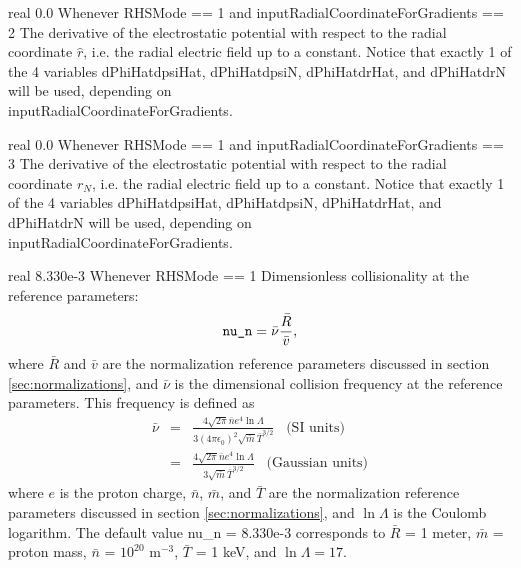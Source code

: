 {real}
{0.0}
{Whenever {\ttfamily RHSMode} == 1 and {\ttfamily inputRadialCoordinateForGradients} == 2}
{The derivative of the electrostatic potential with respect to the radial coordinate $\hat{r}$,
i.e. the radial electric field up to a constant.
Notice that exactly 1 of the 4 variables {\ttfamily dPhiHatdpsiHat}, {\ttfamily dPhiHatdpsiN}, {\ttfamily dPhiHatdrHat}, and {\ttfamily dPhiHatdrN}
will be used, depending on\\
{\ttfamily inputRadialCoordinateForGradients}.
}

\myhrule

{real}
{0.0}
{Whenever {\ttfamily RHSMode} == 1 and {\ttfamily inputRadialCoordinateForGradients} == 3}
{The derivative of the electrostatic potential with respect to the radial coordinate $r_N$,
i.e. the radial electric field up to a constant.
Notice that exactly 1 of the 4 variables {\ttfamily dPhiHatdpsiHat}, {\ttfamily dPhiHatdpsiN}, {\ttfamily dPhiHatdrHat}, and {\ttfamily dPhiHatdrN}
will be used, depending on\\
{\ttfamily inputRadialCoordinateForGradients}.
}

\myhrule

{real}
{8.330e-3}
{Whenever {\ttfamily RHSMode} == 1}
{Dimensionless collisionality at the reference parameters:
\begin{equation}
\mbox{\ttfamily nu\_n} = \bar{\nu} \frac{\bar{R}}{\bar{v}},
\end{equation}
where $\bar{R}$ and $\bar{v}$ are the normalization reference parameters discussed in section \ref{sec:normalizations},
and $\bar{\nu}$ is the dimensional collision frequency at the reference parameters. This frequency is defined as
\begin{eqnarray}
\bar{\nu}
&=& \frac{4\sqrt{2\pi} \bar{n} e^4 \ln\Lambda}{3 (4\pi\epsilon_0)^2 \sqrt{\bar{m}} \bar{T}^{3/2}} \;\;\; \mbox{(SI units}) \\
&=& \frac{4\sqrt{2\pi} \bar{n} e^4 \ln\Lambda}{3 \sqrt{\bar{m}} \bar{T}^{3/2}} \;\;\; \mbox{(Gaussian units}) \nonumber
\end{eqnarray}
where $e$ is the proton charge, $\bar{n}$, $\bar{m}$, and $\bar{T}$ are the normalization reference parameters discussed in section \ref{sec:normalizations},
and $\ln\Lambda$ is the Coulomb logarithm.
The default value {\ttfamily nu\_n} = 8.330e-3 corresponds to $\bar{R}$ = 1 meter,
$\bar{m}$ = proton mass, $\bar{n}$ = $10^{20}$ m$^{-3}$, $\bar{T}$ = 1 keV, and $\ln\Lambda = 17$.
}

